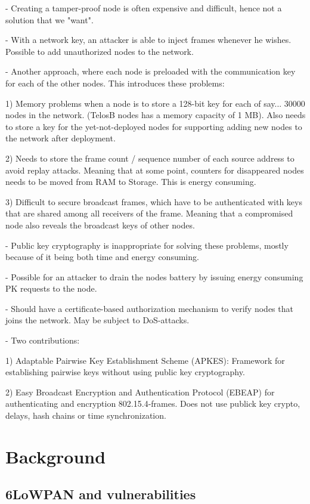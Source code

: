 \documentclass[10pt]{article}
\begin{document}
- Creating a tamper-proof node is often expensive and difficult, hence not a solution that we "want".

- With a network key, an attacker is able to inject frames whenever he wishes. Possible to add unauthorized nodes to the network.

- Another approach, where each node is preloaded with the communication key for each of the other nodes. This introduces these problems:


1)  Memory problems when a node is to store a 128-bit key for each of say... 30000 nodes in the network. (TelosB nodes has a memory capacity of 1 MB). Also needs to store a key for the yet-not-deployed nodes for supporting adding new nodes to the network after deployment.

2) Needs to store the frame count / sequence number of each source address to avoid replay attacks. Meaning that at some point, counters for disappeared nodes needs to be moved from RAM to Storage. This is energy consuming.

3) Difficult to secure broadcast frames, which have to be authenticated with keys that are shared among all receivers of the frame. Meaning that a compromised node also reveals the broadcast keys of other nodes.

- Public key cryptography is inappropriate for solving these problems, mostly because of it being both time and energy consuming.

- Possible for an attacker to drain the nodes battery by issuing energy consuming PK requests to the node.

- Should have a certificate-based authorization mechanism to verify nodes that joins the network. May be subject to DoS-attacks.

- Two contributions:

1) Adaptable Pairwise Key Establishment Scheme (APKES): Framework for establishing pairwise keys without using public key cryptography. 

2) Easy Broadcast Encryption and Authentication Protocol (EBEAP) for authenticating and encryption 802.15.4-frames. Does not use publick key crypto, delays, hash chains or time synchronization.


\section{Background}

\subsection{6LoWPAN and vulnerabilities}
\end{document}
